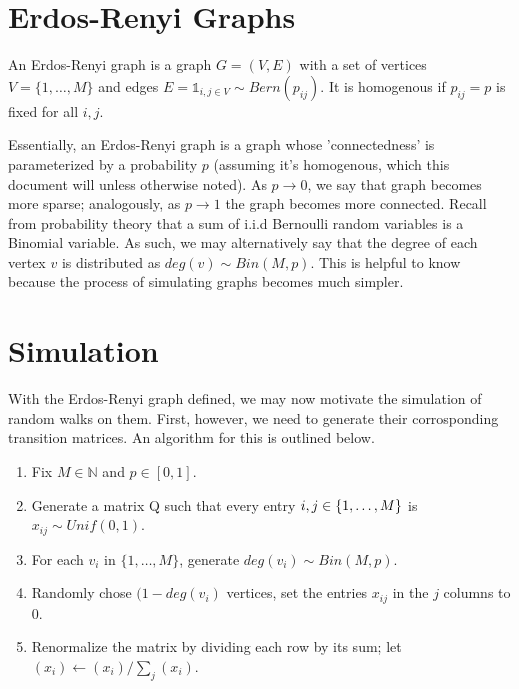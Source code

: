 \section{Erdos-Renyi Graphs}

\begin{definition}
An Erdos-Renyi graph is a graph $G = (V,E)$ with a set of vertices $V = \{1,\dots,M\}$ and edges $E = \mathds{1}_{i,j \in V} \sim Bern(p_{ij})$. It is homogenous if $p_{ij} = p$ is fixed for all $i, j$.
\end{definition}

Essentially, an Erdos-Renyi graph is a graph whose 'connectedness' is parameterized by a probability $p$ (assuming it's homogenous, which this document will unless otherwise noted). As $p \to 0$, we say that graph becomes more sparse; analogously, as $p \to 1$ the graph becomes more connected.\newline
\indent Recall from probability theory that a sum of i.i.d Bernoulli random variables is a Binomial variable. As such, we may alternatively say that the degree of each vertex $v$ is distributed as $deg(v) \sim Bin(M,p)$. This is helpful to know because the process of simulating graphs becomes much simpler.

\newpage

\section{Simulation}
With the Erdos-Renyi graph defined, we may now motivate the simulation of random walks on them. First, however, we need to generate their corrosponding transition matrices. An algorithm for this is outlined below.

\begin{algorithm} 
	\begin{enumerate}
		\qquad
		\item{Fix $M \in \mathbb{N}$ and $p \in [0,1]$}.
		\item{Generate a matrix Q such that every entry $i,j\in \{1,\dots,M\}$ is $x_{ij} \sim Unif(0,1)$.}
		\item{For each $v_i$ in $\{1,\dots,M\}$, generate $deg(v_i) \sim Bin(M,p)$.}
		\item{Randomly chose $(1-deg(v_i)$ vertices, set the entries $x_{ij}$ in the $j$ columns to 0.}
		\item{Renormalize the matrix by dividing each row by its sum; let $(x_i) \leftarrow (x_i)/\sum_j(x_i)$}.
	\end{enumerate}
\end{algorithm}


